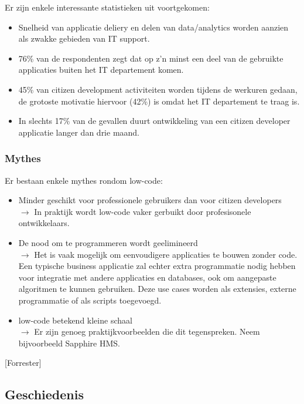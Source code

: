 Er zijn enkele interessante statistieken uit voortgekomen:
\begin{itemize}
    \item Snelheid van applicatie deliery en delen van data/analytics worden aanzien als zwakke gebieden van IT support.
    \item 76\% van de respondenten zegt dat op z'n minst een deel van de gebruikte applicaties buiten het IT departement komen.
    \item 45\% van citizen development activiteiten worden tijdens de werkuren gedaan, de grotoste motivatie hiervoor (42\%) is omdat het IT departement te traag is.
    \item In slechts 17\% van de gevallen duurt ontwikkeling van een citizen developer applicatie langer dan drie maand.
\end{itemize}

\subsubsection{Mythes}

Er bestaan enkele mythes rondom low-code:
\begin{itemize}
    \item Minder geschikt voor professionele gebruikers dan voor citizen developers \\
    $\rightarrow$ In praktijk wordt low-code vaker gerbuikt door profesisonele ontwikkelaars.
    \item De nood om te programmeren wordt geelimineerd \\
    $\rightarrow$ Het is vaak mogelijk om eenvoudigere applicaties te bouwen zonder code. Een typische business applicatie zal echter extra programmatie nodig hebben voor integratie met andere applicaties en databases, ook om aangepaste algoritmen te kunnen gebruiken. Deze use cases worden als extensies, externe programmatie of als scripts toegevoegd.
    \item low-code betekend kleine schaal \\
    $\rightarrow$ Er zijn genoeg praktijkvoorbeelden die dit tegenspreken. Neem bijvoorbeeld Sapphire HMS.
\end{itemize} [Forrester]

\subsection{Geschiedenis}


